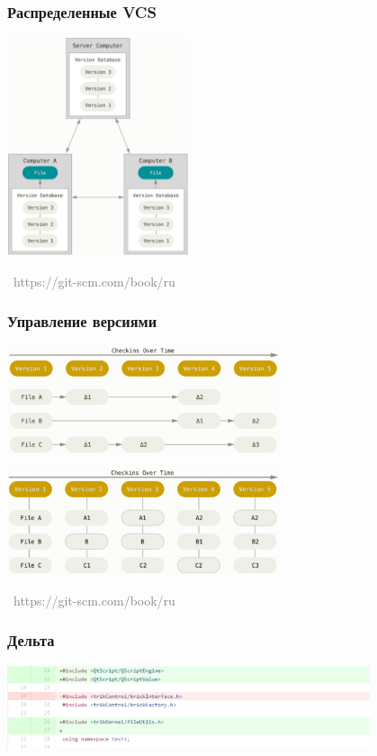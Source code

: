 \documentclass[xetex,mathserif,serif]{beamer}
\newcommand{\attribution}[1] {
    \vspace{-5mm}\begin{flushright}\begin{scriptsize}\textcolor{gray}{\textcopyright\, #1}\end{scriptsize}\end{flushright}
}
\begin{document}
    \begin{frame}
        \frametitle{Распределенные VCS}
        \begin{center}
            \includegraphics[width=0.4\textwidth]{distributedVcs.png}
            \attribution{https://git-scm.com/book/ru}
        \end{center}
    \end{frame}

    \begin{frame}
        \frametitle{Управление версиями}
        \begin{center}
            \includegraphics[width=0.6\textwidth]{deltaVersioning.png}

            \vspace{5mm}
            \includegraphics[width=0.6\textwidth]{snapshotVersioning.png}
            \attribution{https://git-scm.com/book/ru}
        \end{center}
    \end{frame}

    \begin{frame}
        \frametitle{Дельта}
        \begin{center}
            \includegraphics[width=0.8\textwidth]{delta.png}
        \end{center}
    \end{frame}
\end{document}
